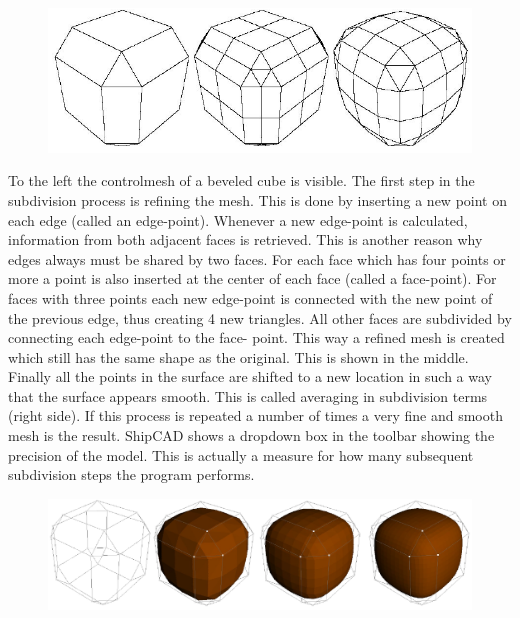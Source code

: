 \documentclass[12pt]{article}
\begin{document}
\begin{figure}[h]
        \centering
        \includegraphics[width=15cm,natwidth=697,natheight=238]{figure4.png}
        \caption{}
        \label{fig:mesh3}
\end{figure}

To the left the controlmesh of a beveled cube is visible. The first
step in the subdivision process is refining the mesh. This is done by
inserting a new point on each edge (called an edge-point).  Whenever a
new edge-point is calculated, information from both adjacent faces is
retrieved. This is another reason why edges always must be shared by
two faces. For each face which has four points or more a point is also
inserted at the center of each face (called a face-point). For faces
with three points each new edge-point is connected with the new point
of the previous edge, thus creating 4 new triangles. All other faces
are subdivided by connecting each edge-point to the face- point. This
way a refined mesh is created which still has the same shape as the
original. This is shown in the middle. Finally all the points in the
surface are shifted to a new location in such a way that the surface
appears smooth. This is called averaging in subdivision terms (right
side). If this process is repeated a number of times a very fine and
smooth mesh is the result. ShipCAD shows a dropdown box in the toolbar
showing the precision of the model. This is actually a measure for how
many subsequent subdivision steps the program performs.

\begin{figure}[h]
        \centering
        \includegraphics[width=15cm,natwidth=1065,natheight=280]{figure5.png}
        \caption{}
        \label{fig:mesh4}
\end{figure}
\end{document}

